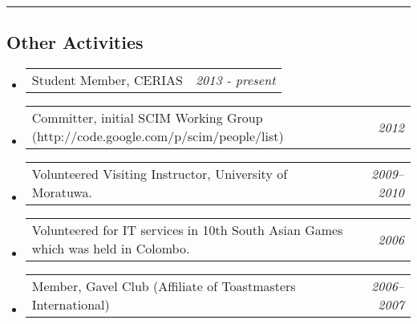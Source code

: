 \documentclass[10pt,letterpaper]{article}
\makeatletter
\newcommand{\headerrow}[2]
{\begin{tabular*}{\linewidth}{l@{\extracolsep{\fill}}r}
	#1 &
	#2 \\
\end{tabular*}}
\makeatother
\begin{document}
\hrule
\vspace{-0.4em}
\subsection*{Other Activities}

\begin{itemize}
	\parskip=0.1em
	
	\item
	\headerrow
		{Student Member, CERIAS}
		{\emph{2013 - present}}
		
	\item
	\headerrow
		{Committer, initial SCIM Working Group (http://code.google.com/p/scim/people/list)}
		{\emph{2012}}
	\item
	\headerrow
		{Volunteered Visiting Instructor, University of Moratuwa.}
		{\emph{2009--2010}}
	
	\item
	\headerrow
		{Volunteered for IT services in 10th South Asian Games which was held in Colombo.}
		{\emph{2006}}
	\item
	\headerrow
		{Member, Gavel Club (Affiliate of Toastmasters International)}
		{\emph{2006--2007}}
	
\end{itemize}	
\end{document}
